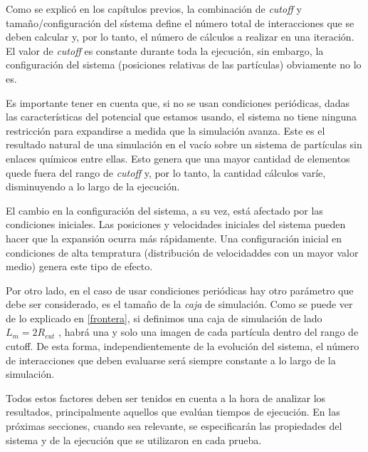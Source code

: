 Como se explicó en los capítulos previos, la combinación de \textit{cutoff} y tamaño/configuración del sístema define el número total de interacciones que se deben calcular y, por lo tanto, 
el número de cálculos a realizar en una iteración. El valor de \textit{cutoff} es constante durante toda la ejecución, sin embargo, la configuración del sistema (posiciones relativas de las partículas) obviamente no lo es.

Es importante tener en cuenta que, si no se usan condiciones periódicas, dadas las características del potencial que estamos usando,
el sistema no tiene ninguna restricción para expandirse a medida que la simulación avanza. Este es el resultado natural de una simulación en el vacío sobre un sistema de partículas sin enlaces químicos entre ellas.
Esto genera que una mayor cantidad de elementos quede fuera del rango de \textit{cutoff} y, por lo tanto, la cantidad cálculos varíe, disminuyendo a lo largo de la ejecución.

El cambio en la configuración del sistema, a su vez, está afectado por las condiciones iniciales. Las posiciones y velocidades iniciales del sistema pueden hacer que la expansión ocurra más rápidamente. 
Una configuración inicial en condiciones de alta tempratura (distribución de velocidaddes con un mayor valor medio) genera este tipo de efecto. 

Por otro lado, en el caso de usar condiciones periódicas hay otro parámetro que debe ser considerado, es el tamaño de la \textit{caja} de simulación. 
Como se puede ver de lo explicado en \ref{frontera}, si definimos una caja de simulación de lado $L_m=2R_{cut}$ , habrá una y solo una imagen de cada partícula dentro del rango de cutoff.
De esta forma, independientemente de la evolución del sistema, el número de interacciones que deben evaluarse será siempre constante a lo largo de la simulación.


Todos estos factores deben ser tenidos en cuenta a la hora de analizar los resultados, principalmente aquellos que evalúan tiempos de ejecución. 
En las próximas secciones, cuando sea relevante, se especificarán las propiedades del sistema y de la ejecución que se utilizaron en cada prueba.
 
%  


